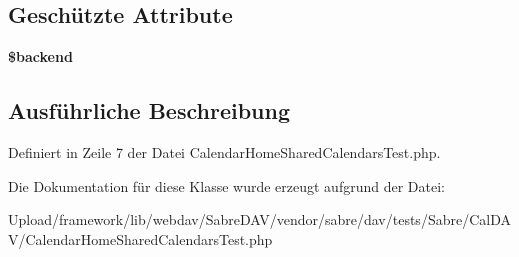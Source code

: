\subsection*{Geschützte Attribute}
\begin{DoxyCompactItemize}
\item 
\mbox{\label{class_sabre_1_1_cal_d_a_v_1_1_calendar_home_shared_calendars_test_a2fbf51e9a863c24cfb3cdb178213581e}} 
{\bfseries \$backend}
\end{DoxyCompactItemize}


\subsection{Ausführliche Beschreibung}


Definiert in Zeile 7 der Datei Calendar\+Home\+Shared\+Calendars\+Test.\+php.



Die Dokumentation für diese Klasse wurde erzeugt aufgrund der Datei\+:\begin{DoxyCompactItemize}
\item 
Upload/framework/lib/webdav/\+Sabre\+D\+A\+V/vendor/sabre/dav/tests/\+Sabre/\+Cal\+D\+A\+V/Calendar\+Home\+Shared\+Calendars\+Test.\+php\end{DoxyCompactItemize}
